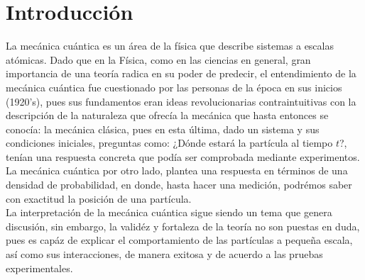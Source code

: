 \chapter{Introducción}\label{ch:introduccion}

La mecánica cuántica es un área de la física que describe sistemas a escalas atómicas. Dado que en la Física, como en las ciencias en general, gran importancia de una teoría radica en su poder de predecir, el entendimiento de la mecánica cuántica fue cuestionado por las personas de la época en sus inicios (1920's), pues sus fundamentos eran ideas revolucionarias contraintuitivas con la descripción de la naturaleza que ofrecía la mecánica que hasta entonces se conocía: la mecánica clásica, pues en esta última, dado un sistema y sus condiciones iniciales, preguntas como: ¿Dónde estará la partícula al tiempo $t$?, tenían una respuesta concreta que podía ser comprobada mediante experimentos. La mecánica cuántica por otro lado, plantea una respuesta en términos de una densidad de probabilidad, en donde, hasta hacer una medición, podrémos saber con exactitud la posición de una partícula.
\\
La interpretación de la mecánica cuántica sigue siendo un tema que genera discusión, sin embargo, la validéz y fortaleza de la teoría no son puestas en duda, pues es capáz de explicar el comportamiento de las partículas a pequeña escala, así como sus interacciones, de manera exitosa y de acuerdo a las pruebas experimentales.
\\

